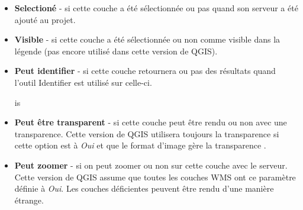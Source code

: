 \begin{itemize}
\begin{itemize}
\item \textbf{Selectioné}         - si cette couche a été sélectionnée ou pas
quand son serveur a été ajouté au projet.

\item \textbf{Visible}          - si cette couche a été sélectionnée ou non
comme visible dans la légende (pas encore utilisé dans cette version de QGIS).

\item \textbf{Peut identifier}     - si cette couche retournera ou pas des
résultats quand l'outil Identifier est utilisé sur celle-ci.

is
\item \textbf{Peut être transparent} - si cette couche peut être rendu ou
non avec une transparence. Cette version de QGIS utilisera toujours la
transparence si cette option est à \textsl{Oui} et que le format d'image gère
la transparence
                                    .

\item \textbf{Peut zoomer}      - si on peut zoomer ou non sur cette couche
avec le serveur. Cette version de QGIS assume que toutes les couches WMS ont ce
paramètre définie à \textsl{Oui}. Les couches déficientes peuvent être rendu
d'une manière étrange.


\end{itemize}
\end{itemize}
